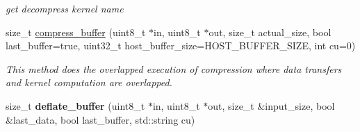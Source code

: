 \begin{DoxyCompactItemize}
\begin{DoxyCompactList}\small\item\em get decompress kernel name \end{DoxyCompactList}\item 
size\-\_\-t \hyperlink{classxf_1_1compression_1_1xfZlib_ab52ee4c6869563448f489cd3c81dd2da}{compress\-\_\-buffer} (uint8\-\_\-t $\ast$in, uint8\-\_\-t $\ast$out, size\-\_\-t actual\-\_\-size, bool last\-\_\-buffer=true, uint32\-\_\-t host\-\_\-buffer\-\_\-size=H\-O\-S\-T\-\_\-\-B\-U\-F\-F\-E\-R\-\_\-\-S\-I\-Z\-E, int cu=0)
\begin{DoxyCompactList}\small\item\em This method does the overlapped execution of compression where data transfers and kernel computation are overlapped. \end{DoxyCompactList}\item 
\hypertarget{classxf_1_1compression_1_1xfZlib_a055669f3d7d7dfe98761b48b0b3ae307}{size\-\_\-t {\bfseries deflate\-\_\-buffer} (uint8\-\_\-t $\ast$in, uint8\-\_\-t $\ast$out, size\-\_\-t \&input\-\_\-size, bool \&last\-\_\-data, bool last\-\_\-buffer, std\-::string cu)}\label{classxf_1_1compression_1_1xfZlib_a055669f3d7d7dfe98761b48b0b3ae307}


\end{DoxyCompactItemize}
